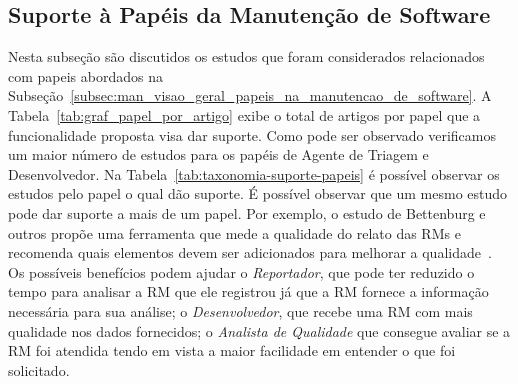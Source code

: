 \subsection{Suporte à Papéis da Manutenção de Software}
\label{sub:extensões_com_suporte_a_papeis}

Nesta subseção são discutidos os estudos que foram considerados relacionados
com papeis abordados na
Subseção~\ref{subsec:man_visao_geral_papeis_na_manutencao_de_software}. A
Tabela~\ref{tab:graf_papel_por_artigo} exibe o total de artigos por papel que a
funcionalidade proposta visa dar suporte.  Como pode ser observado verificamos
um maior número de estudos para os papéis de Agente de Triagem e Desenvolvedor.
Na Tabela~\ref{tab:taxonomia-suporte-papeis} é possível observar os estudos
pelo papel o qual dão suporte. É possível observar que um mesmo estudo pode dar
suporte a mais de um papel. Por exemplo, o estudo de Bettenburg e outros
propõe uma ferramenta que mede a qualidade do relato das RMs e recomenda quais
elementos devem ser adicionados para melhorar a
qualidade~\cite{bettenburg2008makes}. Os possíveis benefícios podem ajudar o
\textit{Reportador}, que pode ter reduzido o tempo para analisar a RM que ele
registrou já que a RM fornece a informação necessária para sua análise; o
\textit{Desenvolvedor}, que recebe uma RM com mais qualidade nos dados
fornecidos; o \textit{Analista de Qualidade} que consegue avaliar se a RM foi
atendida tendo em vista a maior facilidade em entender o que foi solicitado.

\begin{table}[htpb]
\centering
{}
\caption{Total de artigos por papel na manutenção de software}
\label{tab:graf_papel_por_artigo}
\end{table}



